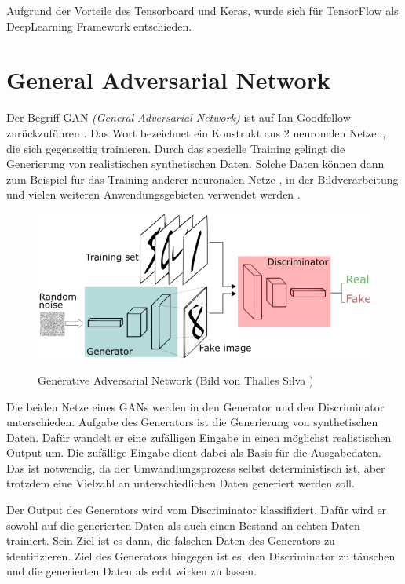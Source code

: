 Aufgrund der Vorteile des Tensorboard und Keras, wurde sich für TensorFlow als DeepLearning Framework entschieden.

\section{General Adversarial Network}
Der Begriff GAN \textit{(General Adversarial Network)} ist auf Ian Goodfellow zurückzuführen \cite{gan-original-paper}.
Das Wort bezeichnet ein Konstrukt aus 2 neuronalen Netzen, die sich gegenseitig trainieren.
Durch das spezielle Training gelingt die Generierung von realistischen synthetischen Daten.
Solche Daten können dann zum Beispiel für das Training anderer neuronalen Netze \cite{gan-application-augmenting-training-data}, in der Bildverarbeitung \cite{gan-application-upscaling, gan-application-blending} und vielen weiteren Anwendungsgebieten verwendet werden \cite{gan-application-dna-optimizes-protein-functions, gan-application-audio-synthesis}.

\begin{figure}[H]
	\centering
	\includegraphics[width=12cm]{kapitel/2_stand_der_technik/img/GAN.png}
	\label{img:gan}
	\caption{Generative Adversarial Network (Bild von Thalles Silva \cite{img-gan})}
\end{figure}

Die beiden Netze eines GANs werden in den Generator und den Discriminator unterschieden.
Aufgabe des Generators ist die Generierung von synthetischen Daten.
Dafür wandelt er eine zufälligen Eingabe in einen möglichst realistischen Output um.
Die zufällige Eingabe dient dabei als Basis für die Ausgabedaten.
Das ist notwendig, da der Umwandlungsprozess selbst deterministisch ist, aber trotzdem eine Vielzahl an unterschiedlichen Daten generiert werden soll.
\newline

Der Output des Generators wird vom Discriminator klassifiziert.
Dafür wird er sowohl auf die generierten Daten als auch einen Bestand an echten Daten trainiert.
Sein Ziel ist es dann, die falschen Daten des Generators zu identifizieren.
Ziel des Generators hingegen ist es, den Discriminator zu täuschen und die generierten Daten als echt wirken zu lassen.
\newline

